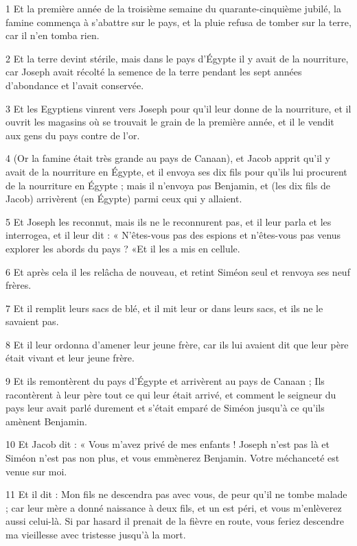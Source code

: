 \par 1 Et la première année de la troisième semaine du quarante-cinquième jubilé, la famine commença à s'abattre sur le pays, et la pluie refusa de tomber sur la terre, car il n'en tomba rien.
\par 2 Et la terre devint stérile, mais dans le pays d'Égypte il y avait de la nourriture, car Joseph avait récolté la semence de la terre pendant les sept années d'abondance et l'avait conservée.
\par 3 Et les Egyptiens vinrent vers Joseph pour qu'il leur donne de la nourriture, et il ouvrit les magasins où se trouvait le grain de la première année, et il le vendit aux gens du pays contre de l'or.
\par 4 (Or la famine était très grande au pays de Canaan), et Jacob apprit qu'il y avait de la nourriture en Égypte, et il envoya ses dix fils pour qu'ils lui procurent de la nourriture en Égypte ; mais il n'envoya pas Benjamin, et (les dix fils de Jacob) arrivèrent (en Égypte) parmi ceux qui y allaient.
\par 5 Et Joseph les reconnut, mais ils ne le reconnurent pas, et il leur parla et les interrogea, et il leur dit : « N'êtes-vous pas des espions et n'êtes-vous pas venus explorer les abords du pays ? «Et il les a mis en cellule.
\par 6 Et après cela il les relâcha de nouveau, et retint Siméon seul et renvoya ses neuf frères.
\par 7 Et il remplit leurs sacs de blé, et il mit leur or dans leurs sacs, et ils ne le savaient pas.
\par 8 Et il leur ordonna d'amener leur jeune frère, car ils lui avaient dit que leur père était vivant et leur jeune frère.
\par 9 Et ils remontèrent du pays d'Égypte et arrivèrent au pays de Canaan ; Ils racontèrent à leur père tout ce qui leur était arrivé, et comment le seigneur du pays leur avait parlé durement et s'était emparé de Siméon jusqu'à ce qu'ils amènent Benjamin.
\par 10 Et Jacob dit : « Vous m'avez privé de mes enfants ! Joseph n'est pas là et Siméon n'est pas non plus, et vous emmènerez Benjamin. Votre méchanceté est venue sur moi.
\par 11 Et il dit : Mon fils ne descendra pas avec vous, de peur qu'il ne tombe malade ; car leur mère a donné naissance à deux fils, et un est péri, et vous m'enlèverez aussi celui-là. Si par hasard il prenait de la fièvre en route, vous feriez descendre ma vieillesse avec tristesse jusqu'à la mort.
